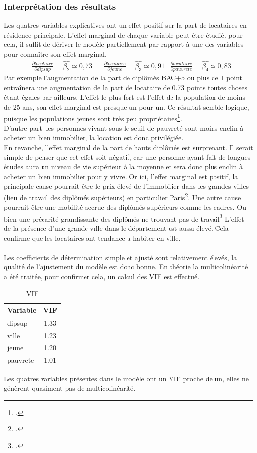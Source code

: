 \documentclass[12pt]{article}
\begin{document}
\subsubsection{Interprétation des résultats}\label{sec:result}
Les quatres variables explicatives ont un effet positif sur la part de locataires en résidence principale. L'effet marginal de chaque variable peut être étudié, pour cela,
il suffit de dériver le modèle partiellement par rapport à une des variables pour connaître son effet marginal.
\begin{align*}
    &\frac{\partial locataire}{\partial dipsup} = \hat{\beta_2} \simeq 0,73 & &\frac{\partial locataire}{\partial jeune} = \hat{\beta_3} \simeq 0,91 &\frac{\partial locataire}{\partial pauvrete} = \hat{\beta_4} \simeq 0,83
\end{align*}
Par exemple l'augmentation de la part de diplômés BAC+5 ou plus de 1 point entraînera une augmentation de la part de locataire de 0.73 points toutes choses étant égales par ailleurs.
L'effet le plus fort est l'effet de la population de moins de 25 ans, son effet marginal est presque un pour un. Ce résultat semble logique, puisque les populations jeunes sont très peu
propriétaires\footcite{insee_portrait_social}.
\\
D'autre part, les personnes vivant sous le seuil de pauvreté sont moins enclin à acheter un bien immobilier, la location est donc privilégiée.
\\
En revanche, l'effet marginal de la part de hauts diplômés est surprenant. Il serait simple de penser que cet effet soit négatif, car une personne ayant fait de longues études aura un niveau
de vie supérieur à la moyenne et sera donc plus enclin à acheter un bien immobilier pour y vivre. Or ici, l'effet marginal est positif, la principale cause pourrait être le prix élevé de l'immobilier dans les grandes villes (lieu de travail des diplômés supérieurs) en particulier Paris\footcite{prix_immo_paris}. Une autre cause pourrait être une mobilité accrue des diplômés
supérieurs comme les cadres. Ou bien une précarité grandissante des diplômés ne trouvant pas de travail\footcite{precarite_etude_sup}
L'effet de la présence d'une grande ville dans le département est aussi élevé. Cela confirme que les locataires ont tendance a habiter en ville.
\\ \\
Les coefficients de détermination simple et ajusté sont relativement élevés, la qualité de l'ajustement du modèle est donc bonne. En théorie la
multicolinéarité a été traitée, pour confirmer cela, un calcul des VIF est effectué.
\begin{table}[H]
\centering
\caption{VIF}
\begin{tabular}{l*{1}{c}}
\toprule
Variable            &         VIF\\
\midrule
dipsup  &  1.33  \\
ville   &  1.23  \\
jeune   &  1.20  \\
pauvrete&  1.01  \\
\bottomrule
\end{tabular}
\end{table}
Les quatres variables présentes dans le modèle ont un VIF proche de un, elles ne génèrent quasiment pas de multicolinéarité.
\end{document}
